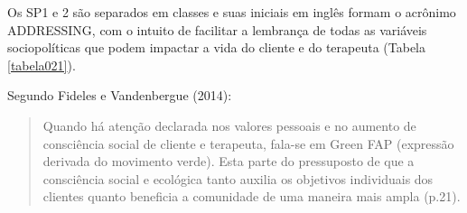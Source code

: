 Os SP1 e 2 são separados em classes e suas iniciais em inglês formam o acrônimo ADDRESSING, com o intuito de facilitar a lembrança de todas as variáveis sociopolíticas que podem impactar a vida do cliente e do terapeuta (Tabela \ref{tabela021}).

Segundo Fideles e Vandenbergue (2014):

\begin{quote}
    Quando há atenção declarada nos valores pessoais e no aumento de consciência social de cliente e terapeuta, fala-se em Green FAP (expressão derivada do movimento verde). Esta parte do pressuposto de que a consciência social e ecológica tanto auxilia os objetivos individuais dos clientes quanto beneficia a comunidade de uma maneira mais ampla (p.21).
\end{quote}

